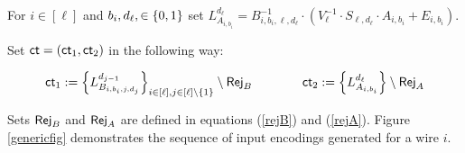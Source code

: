 \item For $i \in[\ell]$ and $b_i,d_{\ell},\in\{0,1\}$ set $L_{A_{i,b_i}}^{d_{\ell}}=B_{i,b_i,\ell,d_{\ell}}^{-1}\cdot (V_\ell^{-1}\cdot S_{\ell,d_{\ell}}\cdot A_{i,b_i}+E_{i,b_i})$. 

Set ${\mathsf{ct}}= ({\mathsf{ct}}_1,{\mathsf{ct}}_2)$ in the following way: 

         
         
          \begin{equation*}
{\mathsf{ct}}_1:=\Big\{ L_{B_{i,b_i,j,d_j}}^{d_{j-1}}\Big\}_{i\in[\ell],j\in[\ell]\setminus{\{1\}}}\setminus {\ensuremath{\mathsf{Rej}}_B}~~~~~~~~~~~~
{\mathsf{ct}}_2:=\Big\{L_{A_{i,b_i}}^{d_{\ell}} \Big\}\setminus {\ensuremath{\mathsf{Rej}}_A}
         \end{equation*}














\EI 


Sets $\mathsf{Rej}_B$ and $\mathsf{Rej}_A$ are defined in equations (\ref{rejB}) and (\ref{rejA}). Figure \ref{genericfig} demonstrates the sequence of input encodings generated for a wire $i$.


